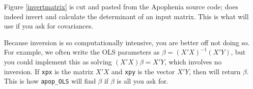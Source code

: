 
Figure \ref{invertmatrix} is cut and pasted from the Apophenia source
code;  does indeed invert and calculate the
determinant of an input matrix. This is what  will use if
you ask for covariances.

Because inversion is so computationally intensive, you are better off
not doing so.  For example, we often write the OLS parameters as $\beta
=(X'X)^{-1}(X'Y)$, but you could implement this as solving
$(X'X)\beta = X'Y$, which involves no inversion. If {\tt xpx} is the
matrix $X'X$ and {\tt xpy} is the vector $X'Y$, then 
 will
return $\beta$. This is how {\tt apop\_OLS} will find $\beta$ if $\beta$
is all you ask for.

